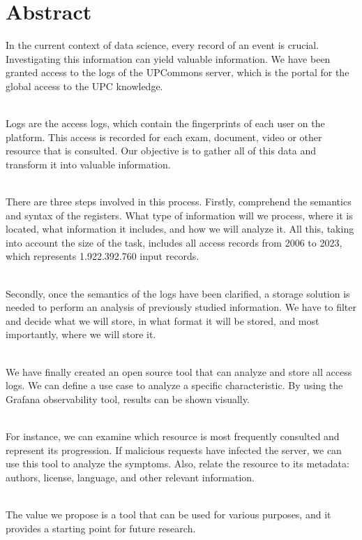 \chapter*{Abstract}\label{ch:abstract-en}

In the current context of data science, every record of an event is crucial.
Investigating this information can yield valuable information.
We have been granted access to the logs of the UPCommons server, which is the portal for the global access to the UPC knowledge.

\noindent \\
Logs are the access logs, which contain the fingerprints of each user on the platform.
This access is recorded for each exam, document, video or other resource that is consulted.
Our objective is to gather all of this data and transform it into valuable information.

\noindent \\
There are three steps involved in this process.
Firstly, comprehend the semantics and syntax of the registers.
What type of information will we process, where it is located, what information it includes, and how we will analyze it.
All this, taking into account the size of the task, includes all access records from 2006 to 2023, which represents 1.922.392.760 input records.

\noindent \\
Secondly, once the semantics of the logs have been clarified, a storage solution is needed to perform an analysis of previously studied information.
We have to filter and decide what we will store, in what format it will be stored, and most importantly, where we will store it.

\noindent \\
We have finally created an open source tool that can analyze and store all access logs.
We can define a use case to analyze a specific characteristic.
By using the Grafana observability tool, results can be shown visually.

\noindent \\
For instance, we can examine which resource is most frequently consulted and represent its progression.
If malicious requests have infected the server, we can use this tool to analyze the symptoms.
Also, relate the resource to its metadata: authors, license, language, and other relevant information.

\noindent \\
The value we propose is a tool that can be used for various purposes, and it provides a starting point for future research.

